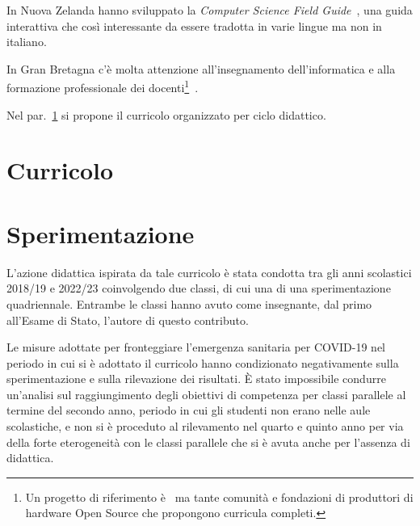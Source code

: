 \documentclass[a4paper]{easychair}
\begin{document}
In Nuova Zelanda hanno sviluppato la \textit{Computer Science Field Guide}~\cite{UniComputerScienceEducationResearchGroupCanterbury2023},
una guida interattiva che così interessante da essere tradotta in varie lingue ma non in italiano.

In Gran Bretagna c'è molta attenzione all'insegnamento dell'informatica
e alla formazione professionale dei docenti\footnote{Un progetto di riferimento è~\cite{nc4ce} ma tante comunità e fondazioni
di produttori di hardware Open Source che propongono curricula completi.
}~\cite{Fowler2021}.



Nel par.~\ref{sec:curricolo} si propone il curricolo organizzato per ciclo didattico.

\section[Curricolo]{Curricolo}
\label{sec:curricolo}



\section{Sperimentazione}

L'azione didattica ispirata da tale curricolo è stata condotta tra gli anni scolastici
2018/19 e 2022/23 coinvolgendo due classi, di cui una di una sperimentazione quadriennale.
Entrambe le classi hanno avuto come insegnante, dal primo all'Esame di Stato,
l'autore di questo contributo.

Le misure adottate per fronteggiare l'emergenza sanitaria per COVID-19 nel periodo in cui
si è adottato il curricolo hanno condizionato negativamente sulla sperimentazione e sulla
rilevazione dei risultati.
È stato impossibile condurre un'analisi sul raggiungimento degli obiettivi di competenza per classi
parallele al termine del secondo anno, periodo in cui gli studenti non erano nelle aule scolastiche,
e non si è proceduto al rilevamento nel quarto e quinto anno per via della forte eterogeneità con le
classi parallele che si è avuta anche per l'assenza di didattica.
\end{document}
